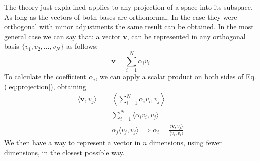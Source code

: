 The theory just expla
ined applies to any projection of a space into its subspace. As long as the vectors of both bases are orthonormal.\newline
In the case they were orthogonal with minor adjustments the same result can be obtained.
In the most general case we can say that:\newline
a vector $\mathbf{v}$, can be represented in any orthogonal basis $\{v_1,v_2,\hdots,v_N\}$ as follows:
\begin{equation}
\mathbf{v} = \sum_{i=1}^N \alpha_i v_i
\label{eq:projection}
\end{equation}
To calculate the coefficient $\alpha_i$, we can apply a scalar product on both sides of Eq.(\ref{eq:projection}), obtaining
\begin{align*}
\langle \mathbf{v}, v_j \rangle &= \left\langle \sum_{i=1}^N \alpha_i v_i, v_j \right\rangle \\
&= \sum_{i=1}^N \langle \alpha_i v_i, v_j \rangle \\
&= \alpha_j \langle v_j, v_j \rangle \implies \alpha_i = \frac{\langle \mathbf{v}, v_j \rangle}{\langle v_i, v_i \rangle}
\end{align*}
We then have a way to represent a vector in $n$ dimensions, using fewer dimensions, in the closest possible way.

